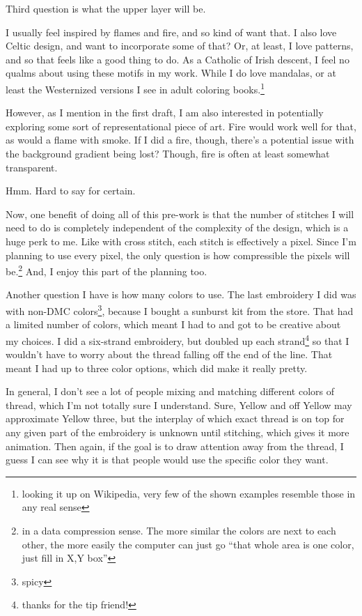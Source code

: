 \documentclass[12pt]{article}
\newcommand{\say}[1]{``#1''}
\renewcommand{\,}{\textsuperscript{,}}
\begin{document}
Third question is what the upper layer will be.

I usually feel inspired by flames and fire, and so kind of want that.  
I also love Celtic design, and want to incorporate some of that?  
Or, at least, I love patterns, and so that feels like a good thing to do.  
As a Catholic of Irish descent, I feel no qualms about using these motifs in my work.  
While I do love mandalas, or at least the Westernized versions I see in adult coloring books.\footnote{looking it up on Wikipedia, very few of the shown examples resemble those in any real sense}

However, as I mention in the first draft, I am also interested in potentially exploring some sort of representational piece of art.  
Fire would work well for that, as would a flame with smoke.  
If I did a fire, though, there's a potential issue with the background gradient being lost?  
Though, fire is often at least somewhat transparent.

Hmm.  
Hard to say for certain.

Now, one benefit of doing all of this pre-work is that the number of stitches I will need to do is completely independent of the complexity of the design, which is a huge perk to me.  
Like with cross stitch, each stitch is effectively a pixel.  
Since I'm planning to use every pixel, the only question is how compressible the pixels will be.\footnote{in a data compression sense. The more similar the colors are next to each other, the more easily the computer can just go \say{that whole area is one color, just fill in X,Y box}}  
And, I enjoy this part of the planning too.

Another question I have is how many colors to use.  
The last embroidery I did was with non-DMC colors\footnote{spicy}, because I bought a sunburst kit from the store.  
That had a limited number of colors, which meant I had to and got to be creative about my choices.  
I did a six-strand embroidery, but doubled up each strand\footnote{thanks for the tip friend!} so that I wouldn't have to worry about the thread falling off the end of the line.  
That meant I had up to three color options, which did make it really pretty.

In general, I don't see a lot of people mixing and matching different colors of thread, which I'm not totally sure I understand.  
Sure, Yellow and off Yellow may approximate Yellow three, but the interplay of which exact thread is on top for any given part of the embroidery is unknown until stitching, which gives it more animation.  
Then again, if the goal is to draw attention away from the thread, I guess I can see why it is that people would use the specific color they want.
\end{document}

